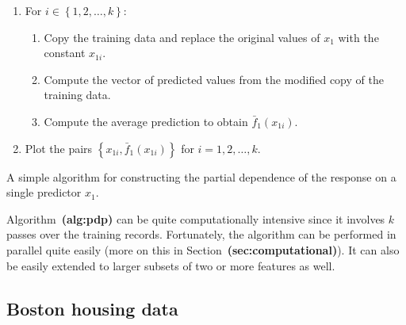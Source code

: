 \documentclass[12pt]{article}
\def\ref#1{\textbf{(#1)}}
\begin{document}
\begin{algorithm}
\begin{enumerate}
  \item For $i \in \left\{1, 2, \dots, k\right\}$:
  \begin{enumerate}
    \item Copy the training data and replace the original values of $x_1$ with the constant $x_{1i}$.
    \item Compute the vector of predicted values from the modified copy of the training data.
    \item Compute the average prediction to obtain $\bar{f}_1\left(x_{1i}\right)$.
  \end{enumerate}
  \item Plot the pairs $\left\{x_{1i}, \bar{f}_1\left(x_{1i}\right)\right\}$ for $i = 1, 2, \dotsc, k$.
\end{enumerate}
\caption{A simple algorithm for constructing the partial dependence of the response on a single predictor $x_1$. \label{alg:pdp}}
\end{algorithm}
Algorithm~\ref{alg:pdp} can be quite computationally intensive since it involves $k$ passes over the training records. Fortunately, the algorithm can be performed in parallel quite easily (more on this in Section~\ref{sec:computational}). It can also be easily extended to larger subsets of two or more features as well.


\subsection{Boston housing data}
\end{document}
